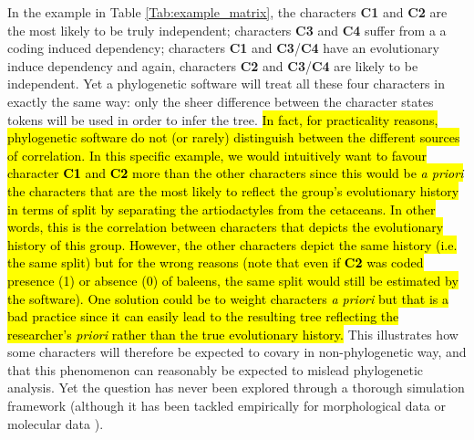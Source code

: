\documentclass[12pt,letterpaper]{article}
\begin{document}
In the example in Table \ref{Tab:example_matrix}, the characters \textbf{C1} and \textbf{C2} are the most likely to be truly independent; characters \textbf{C3} and \textbf{C4} suffer from a a coding induced dependency; characters \textbf{C1} and \textbf{C3}/\textbf{C4} have an evolutionary induce dependency and again, characters \textbf{C2} and \textbf{C3}/\textbf{C4} are likely to be independent.
Yet a phylogenetic software will treat all these four characters in exactly the same way: only the sheer difference between the character states tokens will be used in order to infer the tree.
\hl{In fact, for practicality reasons, phylogenetic software do not (or rarely) distinguish between the different sources of correlation.
In this specific example, we would intuitively want to favour character \textbf{C1} and \textbf{C2} more than the other characters since this would be \textit{a priori} the characters that are the most likely to reflect the group's evolutionary history in terms of split by separating the artiodactyles from the cetaceans.
In other words, this is the correlation between characters that depicts the evolutionary history of this group.
However, the other characters depict the same history (i.e. the same split) but for the wrong reasons (note that even if \textbf{C2} was coded presence (1) or absence (0) of baleens, the same split would still be estimated by the software).
One solution could be to weight characters \textit{a priori} but that is a bad practice since it can easily lead to the resulting tree reflecting the researcher's \textit{priori} rather than the true evolutionary history.}
This illustrates how some characters will therefore be expected to covary in non-phylogenetic way, and that this phenomenon can reasonably be expected to mislead phylogenetic analysis.
Yet the question has never been explored through a thorough simulation framework (although it has been tackled empirically for morphological data \citealt{Davalos01072014} or molecular data \citealt{ZouConvergence}).
\end{document}
